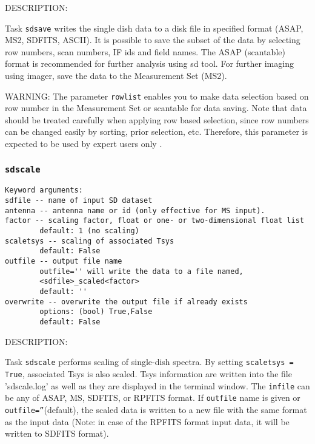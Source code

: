           DESCRIPTION:

          Task {\tt sdsave} writes the single dish data to a disk file in 
          specified format (ASAP, MS2, SDFITS, ASCII). It is possible to
          save the subset of the data by selecting row numbers, scan numbers, IF ids
          and field names. The ASAP (scantable) format is recommended for
          further analysis using sd tool. For further imaging using imager,
          save the data to the Measurement Set (MS2).
          
          WARNING:  The parameter {\tt rowlist} enables you to make data selection based
          on row number in the Measurement Set or scantable for data saving. 
          Note that data should be treated carefully when applying row
          based selection, since row numbers can be changed easily by
          sorting, prior selection, etc. Therefore, this parameter is expected
          to be used by expert users only . 


\subsubsection{{\tt sdscale}}
\label{section:sd.sdtasks.tasks.sdscale}

\begin{verbatim}
Keyword arguments:
sdfile -- name of input SD dataset
antenna -- antenna name or id (only effective for MS input).
factor -- scaling factor, float or one- or two-dimensional float list
        default: 1 (no scaling)
scaletsys -- scaling of associated Tsys
        default: False
outfile -- output file name
        outfile='' will write the data to a file named,
        <sdfile>_scaled<factor>
        default: ''
overwrite -- overwrite the output file if already exists
        options: (bool) True,False
        default: False
\end{verbatim}

    DESCRIPTION:

    Task {\tt sdscale} performs scaling of single-dish spectra.
    By setting {\tt scaletsys = True}, associated Tsys is also scaled.
    Tsys information are written into the file 'sdscale.log'
    as well as they are displayed in the terminal window.
    The {\tt infile} can be any of ASAP, MS, SDFITS, or RPFITS format.
    If {\tt outfile} name is given or {\tt outfile=''}(default), the scaled data is written
    to a new file with the same format as the input data (Note: in case of the
    RPFITS format input data, it will be written to SDFITS format).
    
